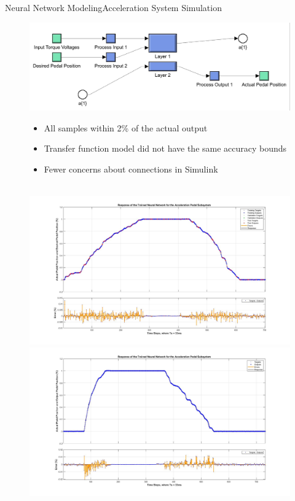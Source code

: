 \documentclass{beamer}
\begin{document}
\begin{frame}{Neural Network Modeling}{Acceleration System Simulation}
	\begin{block}{}
  		\begin{figure}[H]
  			\centering \includegraphics[width=.45\linewidth , height=.37\textheight]{figs/img/accelerationSimulinkBlock.jpg}\quad%
			\centering \begin{minipage}[b][0.4\textheight][c]{.45\linewidth}  \begin{itemize}
			\item All samples within 2\% of the actual output
			\item Transfer function model did not have the same accuracy bounds
			\item Fewer concerns about connections in Simulink
			\end{itemize} \end{minipage}\\[1em]
			\centering \includegraphics[width=.45\linewidth , height=.37\textheight]{figs/img/accelNeuralNetworkTrainedOutput.jpg}\quad%
			\centering \includegraphics[width=.45\linewidth , height=.37\textheight]{figs/img/accelNeuralNetworkTrainedOutput2.jpg}
  		\end{figure}
	\end{block}
\end{frame}
\end{document}
